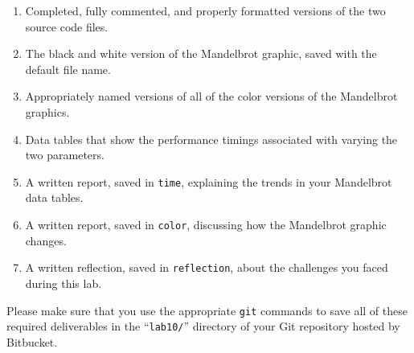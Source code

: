 \vspace{-0.125in}
\begin{enumerate}
    \setlength{\itemsep}{0pt}

  \item Completed, fully commented, and properly formatted versions of the two source code files.
  \item The black and white version of the Mandelbrot graphic, saved with the default file name.
  \item Appropriately named versions of all of the color versions of the Mandelbrot graphics.
  \item Data tables that show the performance timings associated with varying the two parameters.
  \item A written report, saved in {\tt time}, explaining the trends in your Mandelbrot data tables.
  \item A written report, saved in {\tt color}, discussing how the Mandelbrot graphic changes.
  \item A written reflection, saved in {\tt reflection}, about the challenges you faced during this lab.
        
\end{enumerate}
\vspace{-0.1in}

Please make sure that you use the appropriate {\tt git} commands to save all of these required deliverables in the
``{\tt lab10/}'' directory of your Git repository hosted by Bitbucket.






